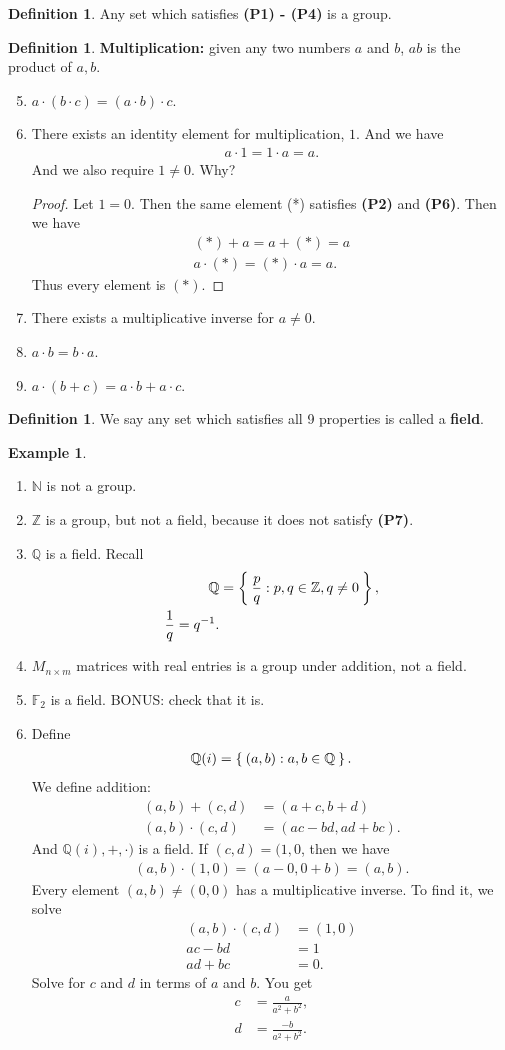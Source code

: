 \documentclass[12pt]{amsbook}
\theoremstyle{plain}
\numberwithin{section}{chapter}
\numberwithin{equation}{chapter}
\theoremstyle{definition}
\newtheorem{Def}[theorem]{Definition}
\newtheorem{Ex}[theorem]{Example}
\theoremstyle{remark}
\theoremstyle{plain}
\newcommand{\z}{\mathbb{Z}}
\newcommand{\n}{\mathbb{N}}
\newcommand{\Q}{\mathbb{Q}}
\newcommand{\F}{\mathbb{F}}
\newcommand{\bee}{\begin{equation}\begin{aligned}}
\newcommand{\eee}{\end{aligned}\end{equation}}
\newcommand{\fracc}{\frac}
\begin{document}
\begin{Def}
Any set which satisfies \textbf{(P1) - (P4)} is a group. 
\end{Def}

\begin{Def}
\textbf{Multiplication: } given any two numbers $a$ and $b$, $ab$ is the product of $a,b$. 
\end{Def}


\begin{enumerate}[label=(\textbf{P\arabic*)}]
\setcounter{enumi}{4}
\item $a \cdot (b \cdot c) = (a \cdot b) \cdot c$. 
\item There exists an identity element for multiplication, $1$. And we have
\bee
a \cdot 1 = 1 \cdot a = a.
\eee
And we also require $1 \neq 0$. Why?
\begin{proof}
Let $1 = 0$. Then the same element (*) satisfies \textbf{(P2)} and \textbf{(P6)}. Then we have
\bee
(*) + a = a + (*) = a\\
a\cdot(*) = (*) \cdot a = a. 
\eee
Thus every element is $(*)$. 
\end{proof}
\item There exists a multiplicative inverse for $a \neq 0$. 
\item $a \cdot b = b \cdot a$. 
\item $a \cdot (b + c) = a \cdot b + a \cdot c$. 
\end{enumerate}

\begin{Def}
We say any set which satisfies all 9 properties is called a \textbf{field}. 
\end{Def}

\begin{Ex}
\begin{enumerate}
\item $\n$ is not a group. 
\item $\z$ is a group, but not a field, because it does not satisfy \textbf{(P7)}. 
\item $\Q$ is a field. Recall
\bee
\Q &= \Set{\fracc{p}{q}: p,q \in \z, q \neq 0},\\
\fracc{1}{q} = q^{-1}.
\eee
\item $M_{n \times m}$ matrices with real entries is a group under addition, not a field. 
\item $\F_2$ is a field. BONUS: check that it is. 
\item Define
\bee
\Q(i) = \Set{(a,b): a,b \in \Q}. 
\eee
We define addition:
\bee
(a,b) + (c,d) &= (a + c,b + d)\\
(a,b) \cdot (c,d) &= (ac - bd, ad + bc). 
\eee
And $\Q(i),+,\cdot)$ is a field. If $(c,d) = (1,0$, then we have
\bee
(a,b) \cdot (1,0) = (a - 0,0 + b) = (a,b).
\eee
Every element $(a,b) \neq (0,0)$ has a multiplicative inverse. To find it, we solve
\bee
(a,b)\cdot(c,d) &= (1,0)\\
ac  - bd &= 1\\
ad + bc &= 0.
\eee
Solve for $c$ and $d$ in terms of $a$ and $b$. You get
\bee
c &= \fracc{a}{a^2 + b^2},\\
d &= \fracc{-b}{a^2 + b^2}.
\eee
\end{enumerate}
\end{Ex}
\end{document}
